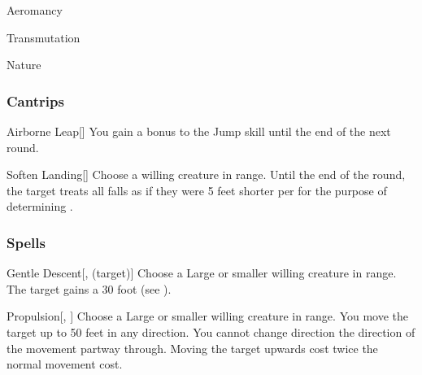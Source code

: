 
\begin{spellsection}{Aeromancy}

\begin{spellheader}
\end{spellheader}


 Transmutation

 Nature

\subsubsection{Cantrips}


\begin{apability}{Airborne Leap}[]
You gain a  bonus to the Jump skill until the end of the next round.
\end{apability}


\begin{apability}{Soften Landing}[]
Choose a willing creature in \rngmed range.
Until the end of the round, the target treats all falls as if they were 5 feet shorter per  for the purpose of determining .
\end{apability}

\end{spellsection}


\subsubsection{Spells}


\lowercase{\hypertarget{spell:Gentle Descent}{}}\label{spell:Gentle Descent}
\begin{attuneability}[\nth{1}]{\hypertarget{spell:Gentle Descent}{Gentle Descent}}[,  (target)]
Choose a Large or smaller willing creature in \rngclose range.
The target gains a 30 foot  (see ).
\end{attuneability}
\vspace{0.25em}



\lowercase{\hypertarget{spell:Propulsion}{}}\label{spell:Propulsion}
\begin{freeability}[\nth{1}]{\hypertarget{spell:Propulsion}{Propulsion}}[, ]
Choose a Large or smaller willing creature in \rngclose range.
You move the target up to 50 feet in any direction.
You cannot change direction the direction of the movement partway through.
Moving the target upwards cost twice the normal movement cost.
\end{freeability}
\vspace{0.25em}



